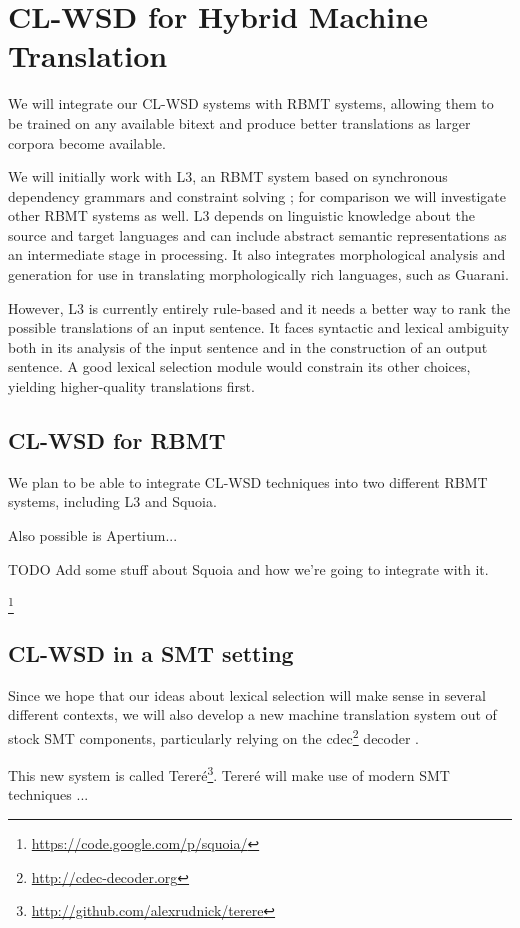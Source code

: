 \section{CL-WSD for Hybrid Machine Translation}
We will integrate our CL-WSD systems with RBMT systems, allowing them
to be trained on any available bitext and produce better translations as larger
corpora become available.

We will initially work with L3, an RBMT system based on synchronous dependency
grammars and constraint solving \cite{gasser:sxdg,gasser:aflat2012};
for comparison we will investigate other RBMT systems as well. L3
depends on linguistic knowledge about the source and target languages and can
include abstract semantic representations as an intermediate stage in
processing. It also integrates morphological analysis and generation for
use in translating morphologically rich languages, such as Guarani.

However, L3 is currently entirely rule-based and it needs a better way to rank
the possible translations of an input sentence. It faces syntactic and lexical
ambiguity both in its analysis of the input sentence and in the construction of
an output sentence.  A good lexical selection module would constrain its other
choices, yielding higher-quality translations first.

\subsection{CL-WSD for RBMT}
We plan to be able to integrate CL-WSD techniques into two different RBMT
systems, including L3 \cite{gasser:sxdg} and Squoia.

Also possible is Apertium...

TODO Add some stuff about Squoia and how we're going to integrate with it.
\cite{riosgonzales-gohring:2013:HyTra}

\footnote{\url{https://code.google.com/p/squoia/}}

\subsection{CL-WSD in a SMT setting}
Since we hope that our ideas about lexical selection will make sense in several
different contexts, we will also develop a new machine translation system out
of stock SMT components, particularly relying on the
cdec\footnote{\url{http://cdec-decoder.org}} decoder \cite{Dyer_etal_2010}.

This new system is called
Tereré\footnote{\url{http://github.com/alexrudnick/terere}}. Tereré will make
use of modern SMT techniques ...

